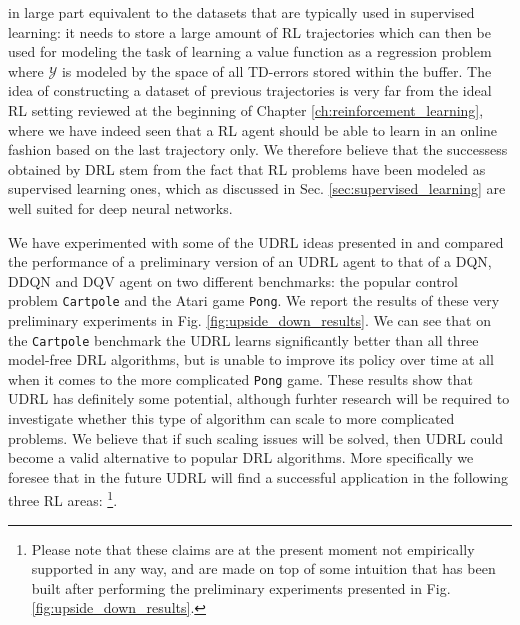 in large part equivalent to the datasets that are typically used in supervised learning: it needs to store a large amount of RL trajectories which can then be used for modeling the task of learning a value function as a regression problem where $\mathcal{Y}$ is modeled by the space of all TD-errors stored within the buffer. The idea of constructing a dataset of previous trajectories is very far from the ideal RL setting reviewed at the beginning of Chapter \ref{ch:reinforcement_learning}, where we have indeed seen that a RL agent should be able to learn in an online fashion based on the last trajectory only. We therefore believe that the successess obtained by DRL stem from the fact that RL problems have been modeled as supervised learning ones, which as discussed in Sec. \ref{sec:supervised_learning} are well suited for deep neural networks.

We have experimented with some of the UDRL ideas presented in \cite{schmidhuber2019reinforcement,srivastava2019training} and compared the performance of a preliminary version of an UDRL agent to that of a DQN, DDQN and DQV agent on two different benchmarks: the popular control problem \texttt{Cartpole} and the Atari game \texttt{Pong}. We report the results of these very preliminary experiments in Fig. \ref{fig:upside_down_results}. We can see that on the \texttt{Cartpole} benchmark the UDRL learns significantly better than all three model-free DRL algorithms, but is unable to improve its policy over time at all when it comes to the more complicated \texttt{Pong} game. These results show that UDRL has definitely some potential, although furhter research will be required to investigate whether this type of algorithm can scale to more complicated problems. We believe that if such scaling issues will be solved, then UDRL could become a valid alternative to popular DRL algorithms. More specifically we foresee that in the future UDRL will find a successful application in the following three RL areas: \footnote{Please note that these claims are at the present moment not empirically supported in any way, and are made on top of some intuition that has been built after performing the preliminary experiments presented in Fig. \ref{fig:upside_down_results}.}.



